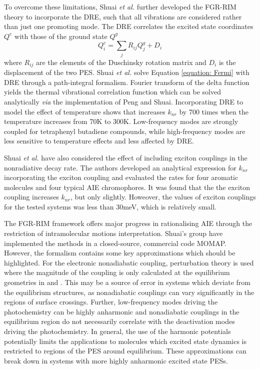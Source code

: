 To overcome these limitations, Shuai \textit{et al.} further developed the \ac{FGR-RIM} theory to incorporate the \ac{DRE}, such that all vibrations are considered rather than just one promoting mode.\cite{Yui2005,Peng2007a,Niu2010} The \ac{DRE} correlates the excited state coordinates $Q^{e}$ with those of the ground state $Q^{g}$
\begin{equation}
    Q^{e}_{i}=\sum_{j}R_{ij}Q^{g}_{j}+D_{i}
\end{equation}
where $R_{ij}$ are the elements of the Duschinsky rotation matrix and $D_{i}$ is the displacement of the two \ac{PES}. Shuai \textit{et al.} solve Equation \ref{equation: Fermi} with \ac{DRE} through a path-integral formalism.\cite{Peng2007a} Fourier transform of the delta function yields the thermal vibrational correlation function which can be solved analytically \textit{via} the implementation of Peng and Shuai.\cite{Peng2013}
Incorporating \ac{DRE} to model the effect of temperature shows that increases $k_{nr}$ by 700 times when the temperature increases from 70K to 300K.\cite{Peng2007} Low-frequency modes are strongly coupled for tetraphenyl butadiene compounds, while high-frequency modes are less sensitive to temperature effects and less affected by \ac{DRE}. 

Shuai \textit{et al.} have also considered the effect of including exciton couplings in the nonradiative decay rate.\cite{Li2017} The authors developed an analytical expression for $k_{nr}$ incorporating the exciton coupling and evaluated the rates for four aromatic molecules and four typical AIE chromophores. It was found that the the exciton coupling increases $k_{nr}$, but only slightly. Howeover, the values of exciton couplings for the tested systems was less than 30meV, which is relatively small.

The \ac{FGR-RIM} framework offers major progress in rationalising AIE through the restriction of intramolecular motions interpretation. Shuai's group have implemented the methods in a closed-source, commercial code MOMAP.\cite{Niu2018} However, the formalism contains some key approximations which should be highlighted. For the electronic nonadiabatic coupling, perturbation theory is used where the magnitude of the coupling is only calculated at the equilibrium geometries in \szero{} and \sone{}. This may be a source of error in systems which deviate from the equilibrium structures, as nonadiabatic couplings can vary significantly in the regions of surface crossings. Further, low-frequency modes driving the photochemistry can be highly anharmonic and nonadiabatic couplings in the equilibrium region do not necessarily correlate with the deactivation modes driving the photochemistry. In general, the use of the harmonic potentials potentially limits the applications to molecules which excited state dynamics is restricted to regions of the PES around equilibrium. These approximations can break down in systems with more highly anharmonic excited state \acp{PES}. 
